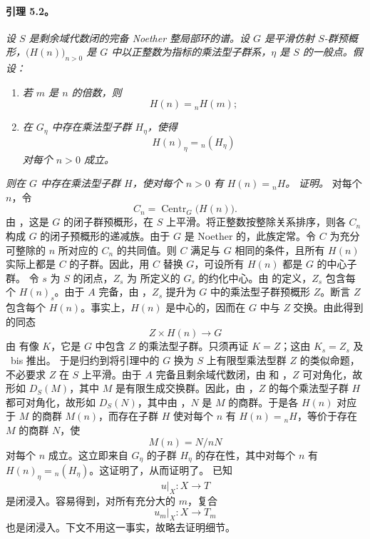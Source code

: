 \paragraph{\textbf{引理 5.2。}}
\emph{设 \(S\) 是剩余域代数闭的完备 Noether 整局部环的谱。设 \(G\) 是平滑仿射 \(S\)-群预概形，\(\bigl(H(n)\bigr)_{n>0}\) 是 \(G\) 中以正整数为指标的乘法型子群系，\(\eta\) 是 \(S\) 的一般点。假设：}
\begin{enumerate}
\item[\textup{(a)}] \emph{若 \(m\) 是 \(n\) 的倍数，则
\[
  H(n)={}_nH(m);
\]
}
\item[\textup{\SGAInlineRefTarget{sga3:xii:5.2:item:b}(b)}] \emph{在 \(G_\eta\) 中存在乘法型子群 \(H_\eta\)，使得
\[
  H(n)_\eta={}_n(H_\eta)
\]
对每个 \(n>0\) 成立。}
\end{enumerate}
\emph{则在 \(G\) 中存在乘法型子群 \(H\)，使对每个 \(n>0\) 有 \(H(n)={}_nH\)。}
\emph{证明。}
对每个 \(n\)，令
\[
  C_n=\operatorname{Centr}_G\bigl(H(n)\bigr).
\]
由 ，这是 \(G\) 的闭子群预概形，在 \(S\) 上平滑。将正整数按整除关系排序，则各 \(C_n\) 构成 \(G\) 的闭子预概形的递减族。由于 \(G\) 是 Noether 的，此族定常。令 \(C\) 为充分可整除的 \(n\) 所对应的 \(C_n\) 的共同值。则 \(C\) 满足与 \(G\) 相同的条件，且所有 \(H(n)\) 实际上都是 \(C\) 的子群。因此，用 \(C\) 替换 \(G\)，可设所有 \(H(n)\) 都是 \(G\) 的中心子群。
令 \(s\) 为 \(S\) 的闭点，\(Z_s\) 为  所定义的 \(G_s\) 的约化中心。由  的定义，\(Z_s\) 包含每个 \(H(n)_s\)。由于 \(A\) 完备，由 ，\(Z_s\) 提升为 \(G\) 中的乘法型子群预概形 \(Z\)。断言 \(Z\) 包含每个 \(H(n)\)。事实上，\(H(n)\) 是中心的，因而在 \(G\) 中与 \(Z\) 交换。由此得到的同态
\[
  Z\times H(n)\longrightarrow G
\]
由  有像 \(K\)，它是 \(G\) 中包含 \(Z\) 的乘法型子群。只须再证 \(K=Z\)；这由 \(K_s=Z_s\) 及 ~bis 推出。
于是归约到将引理中的 \(G\) 换为 \(S\) 上有限型乘法型群 \(Z\) 的类似命题，不必要求 \(Z\) 在 \(S\) 上平滑。由于 \(A\) 完备且剩余域代数闭，由  和 ，\(Z\) 可对角化，故形如 \(D_S(M)\)，其中 \(M\) 是有限生成交换群。因此，由 ，\(Z\) 的每个乘法型子群 \(H\) 都可对角化，故形如 \(D_S(N)\)，其中由 ，\(N\) 是 \(M\) 的商群。于是各 \(H(n)\) 对应于 \(M\) 的商群 \(M(n)\)，而存在子群 \(H\) 使对每个 \(n\) 有 \(H(n)={}_nH\)，等价于存在 \(M\) 的商群 \(N\)，使
\[
  M(n)=N/nN
\]
对每个 \(n\) 成立。这立即来自 \(G_\eta\) 的子群 \(H_\eta\) 的存在性，其中对每个 \(n\) 有 \(H(n)_\eta={}_n(H_\eta)\)。这证明了，从而证明了。
\textup{} 已知
\[
  u|_X:X\longrightarrow T
\]
是闭浸入。容易得到，对所有充分大的 \(m\)，复合
\[
  u_m|_X:X\longrightarrow T_m
\]
也是闭浸入。下文不用这一事实，故略去证明细节。
